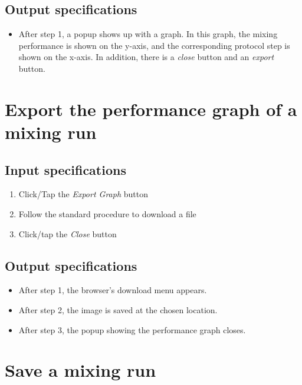 \subsection*{Output specifications}
\begin{itemize}
\item After step 1, a popup shows up with a graph. In this graph, the mixing performance is shown on the y-axis, and the corresponding protocol step is shown on the x-axis. In addition, there is a \emph{close} button and an \emph{export} button.
\end{itemize}

\section{Export the performance graph of a mixing run}

\subsection*{Input specifications}
\begin{enumerate}
\item Click/Tap the \emph{Export Graph} button
\item Follow the standard procedure to download a file
\item Click/tap the \emph{Close} button
\end{enumerate}

\subsection*{Output specifications}
\begin{itemize}
\item After step 1, the browser's download menu appears.
\item After step 2, the image is saved at the chosen location.
\item After step 3, the popup showing the performance graph closes.
\end{itemize}

\section{Save a mixing run}

